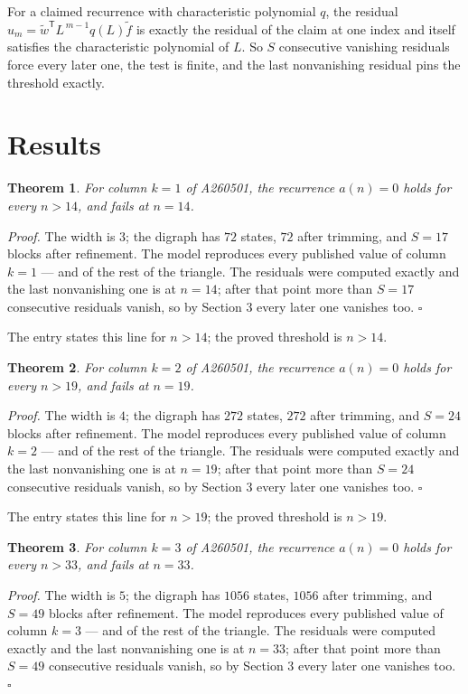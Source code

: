 \documentclass[11pt]{article}
\newtheorem{theorem}{Theorem}
\theoremstyle{definition}
\begin{document}
For a claimed recurrence with characteristic polynomial $q$, the residual $u_m = \tilde w^{\mathsf T}L^{\,m-1}q(L)\tilde f$ is exactly the residual of the claim at one index and itself satisfies the characteristic polynomial of $L$. So $S$ consecutive vanishing residuals force every later one, the test is finite, and the last nonvanishing residual pins the threshold exactly.

\section{Results}

\begin{theorem} For column $k = 1$ of A260501, the recurrence $a(n) = 0$ holds for every $n > 14$, and fails at $n = 14$.\end{theorem}

{\itshape Proof.} The width is $3$; the digraph has $72$ states, $72$ after trimming, and $S = 17$ blocks after refinement. The model reproduces every published value of column $k = 1$ --- and of the rest of the triangle. The residuals were computed exactly and the last nonvanishing one is at $n = 14$; after that point more than $S = 17$ consecutive residuals vanish, so by Section 3 every later one vanishes too. $\square$

The entry states this line for $n > 14$; the proved threshold is $n > 14$.

\begin{theorem} For column $k = 2$ of A260501, the recurrence $a(n) = 0$ holds for every $n > 19$, and fails at $n = 19$.\end{theorem}

{\itshape Proof.} The width is $4$; the digraph has $272$ states, $272$ after trimming, and $S = 24$ blocks after refinement. The model reproduces every published value of column $k = 2$ --- and of the rest of the triangle. The residuals were computed exactly and the last nonvanishing one is at $n = 19$; after that point more than $S = 24$ consecutive residuals vanish, so by Section 3 every later one vanishes too. $\square$

The entry states this line for $n > 19$; the proved threshold is $n > 19$.

\begin{theorem} For column $k = 3$ of A260501, the recurrence $a(n) = 0$ holds for every $n > 33$, and fails at $n = 33$.\end{theorem}

{\itshape Proof.} The width is $5$; the digraph has $1056$ states, $1056$ after trimming, and $S = 49$ blocks after refinement. The model reproduces every published value of column $k = 3$ --- and of the rest of the triangle. The residuals were computed exactly and the last nonvanishing one is at $n = 33$; after that point more than $S = 49$ consecutive residuals vanish, so by Section 3 every later one vanishes too. $\square$
\end{document}
